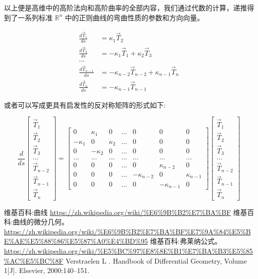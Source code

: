 \documentclass[fontset=windows]{article}
\begin{document}
以上便是高维中的高阶法向和高阶曲率的全部内容，我们通过代数的计算，递推得到了一系列标准 $\mathbb{R}^n$ 中的正则曲线的弯曲性质的参数和方向向量。

$$
\begin{aligned}    
    \frac{d\vec{T}_1}{ds}   &= \kappa_1 \vec{T}_2 \\
    \frac{d\vec{T}_2}{ds}   &= -\kappa_1 \vec{T}_1  + \kappa_2 \vec{T}_3 \\
    ...\\
    \frac{d\vec{T}_{n-1}}{ds} &= -\kappa_{n-2} \vec{T}_{n-2}  + \kappa_{n-1} \vec{T}_{n} \\
    \frac{d\vec{T}_{n}}{ds} &= -\kappa_{n-1} \vec{T}_{n-1}
\end{aligned}
$$

或者可以写成更具有启发性的反对称矩阵的形式如下:

$$
\frac{d}{ds}
\begin{bmatrix}
    \vec{T}_1 \\
    \vec{T}_2 \\
    \vec{T}_3 \\
    ...       \\
    \vec{T}_{n-2}\\
    \vec{T}_{n-1}\\
    \vec{T}_{n}
\end{bmatrix} = 
\begin{bmatrix}
        0    &\kappa_1 &    0   &...& 0 & 0 & 0\\
    -\kappa_1&   0     &\kappa_2&...& 0 & 0 & 0\\
    0        &-\kappa_2&   0    &...& 0 & 0 & 0\\
    ...      &   ...   &   ...  &...& ... & ... &  ... \\
    0        &    0    &   0    &...& 0 & \kappa_{n-2} & 0 \\
    0        &    0    &   0    &...&-\kappa_{n-2}& 0  & \kappa_{n-1}\\
    0        &    0    &   0    &...& 0 &-\kappa_{n-1} &  0
\end{bmatrix}
\begin{bmatrix}
    \vec{T}_1 \\
    \vec{T}_2 \\
    \vec{T}_3 \\
    ...       \\
    \vec{T}_{n-2}\\
    \vec{T}_{n-1}\\
    \vec{T}_{n}
\end{bmatrix}
$$


\begin{thebibliography}{30}
     维基百科:曲线 \url{https://zh.wikipedia.org/wiki/%E6%9B%B2%E7%BA%BF}
     维基百科:曲线的微分几何。 \url{https://zh.wikipedia.org/wiki/%E6%9B%B2%E7%BA%BF%E7%9A%84%E5%BE%AE%E5%88%86%E5%87%A0%E4%BD%95}
     维基百科:弗莱纳公式。 \url{https://zh.wikipedia.org/wiki/%E5%BC%97%E8%8E%B1%E7%BA%B3%E5%85%AC%E5%BC%8F}
     Verstraelen L . Handbook of Differential Geometry, Volume 1[J]. Elsevier, 2000:140–151.

\end{thebibliography}
\end{document}
